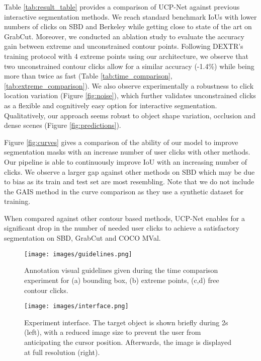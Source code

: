 \documentclass[letterpaper, 10 pt, conference]{ieeeconf}
\begin{document}
Table \ref{tab:result_table} provides a comparison of UCP-Net against previous interactive segmentation methods. We reach standard benchmark IoUs with lower numbers of clicks on SBD and Berkeley while getting close to state of the art on GrabCut. Moreover, we conducted an ablation study to evaluate the accuracy gain between extreme and unconstrained contour points. Following DEXTR's training protocol \cite{maninis18} with 4 extreme points using our architecture, we observe that two unconstrained contour clicks allow for a similar accuracy (-1.4\%) while being more than twice as fast (Table \ref{tab:time_comparison}, \ref{tab:extreme_comparison}). We also observe experimentally a robustness to click location variation (Figure \ref{fig:noise}), which further validates unconstrained clicks as a flexible and cognitively easy option for interactive segmentation. Qualitatively, our approach seems robust to object shape variation, occlusion and dense scenes (Figure \ref{fig:predictions}).

Figure \ref{fig:curves} gives a comparison of the ability of our model to improve segmentation masks with an increase number of user clicks with other methods. Our pipeline is able to continuously improve IoU with an increasing number of clicks. We observe a larger gap against other methods on SBD \cite{bharath11} which may be due to bias as its train and test set are most resembling. Note that we do not include the GAIS method in the curve comparison as they use a synthetic dataset for training.

When compared against other contour based methods, UCP-Net enables for a significant drop in the number of needed user clicks to achieve a satisfactory segmentation on SBD, GrabCut and COCO MVal. 

\begin{figure}
    \centering
    \texttt{[image: images/guidelines.png]}
    \caption{Annotation visual guidelines given during the time comparison experiment for (a) bounding box, (b) extreme points, (c,d) free contour clicks.}
    \label{fig:illustration_guidelines}
\end{figure}
\begin{figure}
    \centering
    \texttt{[image: images/interface.png]}
    \caption{Experiment interface. The target object is shown briefly during 2s (left), with a reduced image size to prevent the user from anticipating the cursor position. Afterwards, the image is displayed at full resolution (right).}
    \label{fig:interface}
\end{figure}
\end{document}
